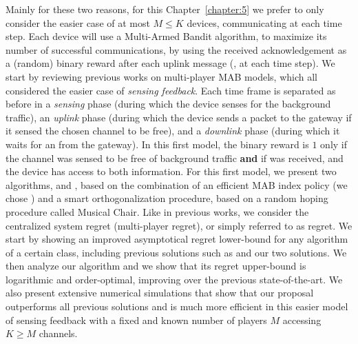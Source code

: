 Mainly for these two reasons, for this Chapter~\ref{chapter:5} we prefer to only consider the easier case of at most $M \leq K$ devices, communicating at each time step.
Each device will use a Multi-Armed Bandit algorithm, to maximize its number of successful communications, by using the received acknowledgement \Ack{} as a (random) binary reward after each uplink message (\ie, at each time step).
%
We start by reviewing previous works on multi-player MAB models, which all considered the easier case of \emph{sensing feedback}.
Each time frame is separated as before in a \emph{sensing} phase (during which the device senses for the background traffic),
an \emph{uplink} phase (during which the device sends a packet to the gateway if it sensed the chosen channel to be free),
and a \emph{downlink} phase (during which it waits for an \Ack{} from the gateway).
In this first model, the binary reward is $1$ only if the channel was sensed to be free of background traffic \textbf{and} if \Ack{} was received, and the device has access to both information.
For this first model, we present two algorithms, \RandTopM{} and \MCTopM, based on the combination of an efficient MAB index policy (we chose \klUCB) and a smart orthogonalization procedure, based on a random hoping procedure called Musical Chair.
Like in previous works, we consider the centralized system regret (multi-player regret), or simply referred to as regret.
We start by showing an improved asymptotical regret lower-bound for any algorithm of a certain class, including previous solutions such as \rhoRand{} and our two solutions.
We then analyze our \MCTopM{} algorithm and we show that its regret upper-bound is logarithmic and order-optimal, improving over the previous state-of-the-art.
We also present extensive numerical simulations that show that our proposal outperforms all previous solutions and is much more efficient in this easier model of sensing feedback with a fixed and known number of players $M$ accessing $K \geq M$ channels.

